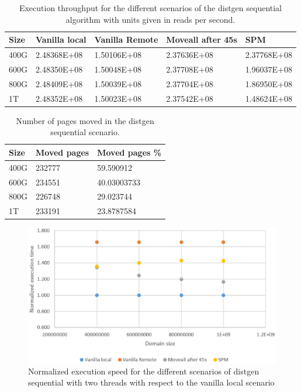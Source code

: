 \begin{table}[th]
	\centering
		\begin{tabularx}{\textwidth}{|l|l|l|l|X|}
		\hline
			Size & Vanilla local & Vanilla Remote & Moveall after 45s & SPM \\
			\hline
			400G & 2.48368E+08 & 1.50106E+08 & 2.37636E+08& 2.37768E+08\\
			\hline
			600G & 2.48350E+08 & 1.50048E+08  & 2.37708E+08 & 1.96037E+08\\
			\hline
			800G & 2.48409E+08 & 1.50039E+08 & 2.37704E+08 & 1.86950E+08 \\
			\hline
			1T & 2.48352E+08 & 1.50023E+08 & 2.37542E+08 & 1.48624E+08 \\
			\hline
		\end{tabularx}
		\caption{Execution throughput for the different scenarios of the distgen sequential algorithm with units given in reads per second.}
		\label{table:res-dgentrgseq2t}
\end{table}

\begin{table}[th]
	\centering
		\begin{tabularx}{.6\textwidth}{|l|l|X|}
		\hline
			Size & Moved pages & Moved pages \%  \\
			\hline
			400G & 232777 & 59.590912 \\
			\hline
			600G & 234551 & 40.03003733\\
			\hline
			800G & 226748 & 29.023744 \\
			\hline
			1T & 233191 & 23.8787584 \\
			\hline
		\end{tabularx}
		\caption{Number of pages moved in the distgen sequential scenario.}
		\label{table:res-dgenmvdseq2t}
\end{table}

\begin{figure}
	\centering
		\includegraphics[width=.8\textwidth]{figures/time-dgentt-ser.eps}
		\caption{Normalized execution speed for the different scenarios of  distgen sequential with two threads with respect to the vanilla local scenario}
		\label{fig:res-dgentimseq2t}
\end{figure}

